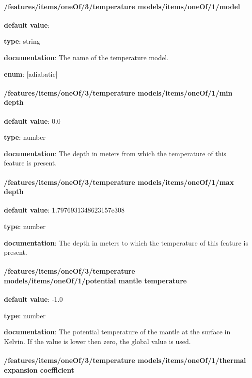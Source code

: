 \paragraph{/features/items/oneOf/3/temperature models/items/oneOf/1/model} \begin{itemized}
\item {\bf default value}: 
\item {\bf type}: string
\item {\bf documentation}: The name of the temperature model.
\item {\bf enum}: [adiabatic]\end{itemized}\paragraph{/features/items/oneOf/3/temperature models/items/oneOf/1/min depth} \begin{itemized}
\item {\bf default value}: 0.0
\item {\bf type}: number
\item {\bf documentation}: The depth in meters from which the temperature of this feature is present.
\end{itemized}\paragraph{/features/items/oneOf/3/temperature models/items/oneOf/1/max depth} \begin{itemized}
\item {\bf default value}: 1.7976931348623157e308
\item {\bf type}: number
\item {\bf documentation}: The depth in meters to which the temperature of this feature is present.
\end{itemized}\paragraph{/features/items/oneOf/3/temperature models/items/oneOf/1/potential mantle temperature} \begin{itemized}
\item {\bf default value}: -1.0
\item {\bf type}: number
\item {\bf documentation}: The potential temperature of the mantle at the surface in Kelvin. If the value is lower then zero, the global value is used.
\end{itemized}\paragraph{/features/items/oneOf/3/temperature models/items/oneOf/1/thermal expansion coefficient} \begin{itemized}

\end{itemized}
